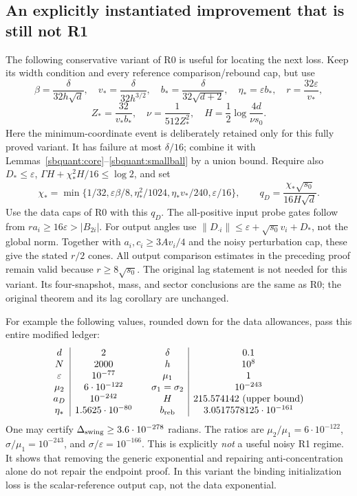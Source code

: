 \documentclass[11pt]{article}
\theoremstyle{remark}
\begin{document}
\subsection{An explicitly instantiated improvement that is still not R1}

The following conservative variant of R0 is useful for locating the next
loss. Keep its width condition and every reference comparison/rebound cap,
but use
\[
 \beta=\frac{\delta}{32h\sqrt d},\quad
 v_* =\frac{\delta}{32h^{3/2}},\quad
 b_* =\frac{\delta}{32\sqrt{d+2}},\quad
 \eta_* =\varepsilon b_*,\quad r=\frac{32\varepsilon}{v_*},
\]
\[
 Z_* =\frac{32}{v_*b_*},\quad
 \nu=\frac1{512Z_*^2},\quad
 H=\frac12\log\frac{4d}{\nu s_0}.
\]
Here the minimum-coordinate event is deliberately retained only for this
fully proved variant. It has failure at most $\delta/16$; combine it with
Lemmas~\ref{sbquant:core}--\ref{sbquant:smallball} by a union bound.
Require also $D_*\le\varepsilon$,
$\Gamma H+\chi_*^2H/16\le\log2$, and set
\[
 \chi_* =\min\{1/32,\varepsilon\beta/8,\eta_*^2/1024,
                   \eta_*v_*/240,\varepsilon/16\},\qquad
 q_D=\frac{\chi_*\sqrt{s_0}}{16H\sqrt d}.
\]
Use the data caps of R0 with this $q_D$. The all-positive input probe
gates follow from $ra_i\ge16\varepsilon>|B_{2i}|$.
For output angles use
$\|D_{\cdot i}\|\le\varepsilon+\sqrt{s_0}v_i+D_*$,
not the global norm. Together with $a_i,c_i\ge3Av_i/4$ and the
noisy perturbation cap, these give the stated $r/2$ cones.
All output comparison estimates in the preceding proof remain valid
because $r\ge8\sqrt{s_0}$. The original lag statement is not needed for
this variant. Its four-snapshot, mass, and sector conclusions are the
same as R0; the original theorem and its lag corollary are unchanged.

For example the following values, rounded down for the data allowances,
pass this entire modified ledger:
\[
\begin{array}{c|c@{\qquad}c|c}
 d&2&\delta&0.1\\
 N&2000&h&10^8\\
 \varepsilon&10^{-77}&\mu_1&1\\
 \mu_2&6\cdot10^{-122}&\sigma_1=\sigma_2&10^{-243}\\
 a_D&10^{-242}&H&215.574142\text{ (upper bound)}\\
 \eta_*&1.5625\cdot10^{-80}&b_{\rm reb}&3.0517578125\cdot10^{-161}
\end{array}
\]
One may certify $\Delta_{\rm swing}\ge3.6\cdot10^{-278}$ radians.
The ratios are $\mu_2/\mu_1=6\cdot10^{-122}$,
$\sigma/\mu_1=10^{-243}$, and $\sigma/\varepsilon=10^{-166}$.
This is explicitly \emph{not} a useful noisy R1 regime. It shows that
removing the generic exponential and repairing anti-concentration alone
do not repair the endpoint proof. In this variant the binding initialization
loss is the scalar-reference output cap, not the data exponential.
\end{document}
